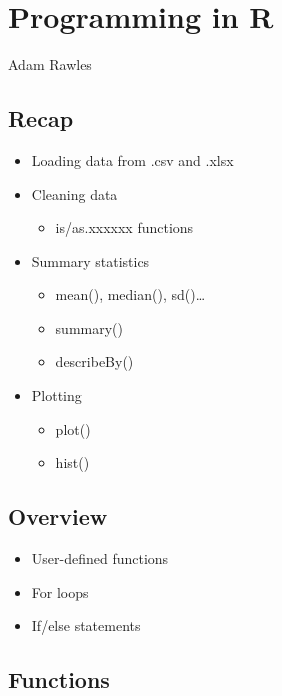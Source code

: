 \documentclass[]{article}
\title{}
\author{}
\date{}
\providecommand{\tightlist}{%
  \setlength{\itemsep}{0pt}\setlength{\parskip}{0pt}}
\begin{document}
\section{Programming in R}\label{programming-in-r}

Adam Rawles

\subsection{Recap}\label{recap}

\begin{itemize}
\tightlist
\item
  Loading data from .csv and .xlsx
\item
  Cleaning data

  \begin{itemize}
  \tightlist
  \item
    is/as.xxxxxx functions
  \end{itemize}
\item
  Summary statistics

  \begin{itemize}
  \tightlist
  \item
    mean(), median(), sd()\ldots{}
  \item
    summary()
  \item
    describeBy()
  \end{itemize}
\item
  Plotting

  \begin{itemize}
  \tightlist
  \item
    plot()
  \item
    hist()
  \end{itemize}
\end{itemize}

\subsection{Overview}\label{overview}

\begin{itemize}
\tightlist
\item
  User-defined functions
\item
  For loops
\item
  If/else statements
\end{itemize}

\subsection{Functions}\label{functions}
\end{document}
